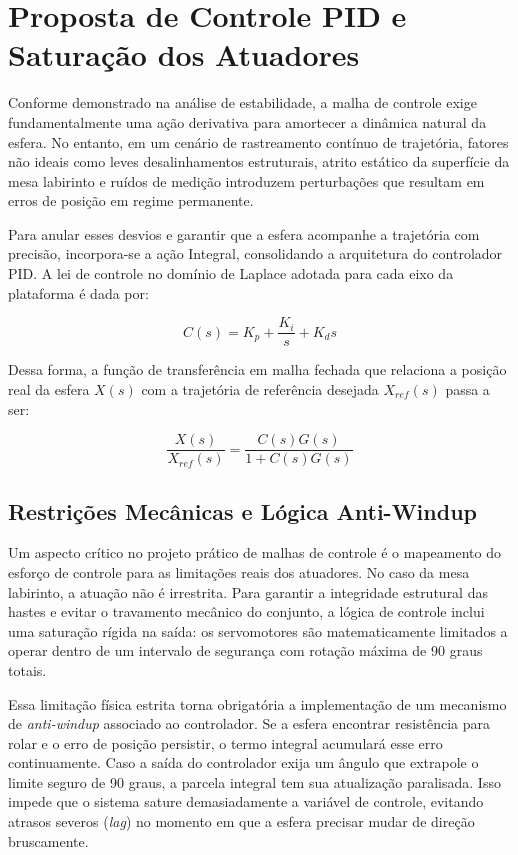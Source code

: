 \documentclass[12pt]{article}
\begin{document}
\section{Proposta de Controle PID e Saturação dos Atuadores}

Conforme demonstrado na análise de estabilidade, a malha de controle exige fundamentalmente uma ação derivativa para amortecer a dinâmica natural da esfera. No entanto, em um cenário de rastreamento contínuo de trajetória, fatores não ideais como leves desalinhamentos estruturais, atrito estático da superfície da mesa labirinto e ruídos de medição introduzem perturbações que resultam em erros de posição em regime permanente.

Para anular esses desvios e garantir que a esfera acompanhe a trajetória com precisão, incorpora-se a ação Integral, consolidando a arquitetura do controlador PID. A lei de controle no domínio de Laplace adotada para cada eixo da plataforma é dada por:

\begin{equation}
    C(s) = K_p + \frac{K_i}{s} + K_d s
\end{equation}

Dessa forma, a função de transferência em malha fechada que relaciona a posição real da esfera $X(s)$ com a trajetória de referência desejada $X_{ref}(s)$ passa a ser:

\begin{equation}
    \frac{X(s)}{X_{ref}(s)} = \frac{C(s)G(s)}{1 + C(s)G(s)}
\end{equation}

\subsection{Restrições Mecânicas e Lógica Anti-Windup}

Um aspecto crítico no projeto prático de malhas de controle é o mapeamento do esforço de controle para as limitações reais dos atuadores. No caso da mesa labirinto, a atuação não é irrestrita. Para garantir a integridade estrutural das hastes e evitar o travamento mecânico do conjunto, a lógica de controle inclui uma saturação rígida na saída: os servomotores são matematicamente limitados a operar dentro de um intervalo de segurança com rotação máxima de 90 graus totais.

Essa limitação física estrita torna obrigatória a implementação de um mecanismo de \textit{anti-windup} associado ao controlador. Se a esfera encontrar resistência para rolar e o erro de posição persistir, o termo integral acumulará esse erro continuamente. Caso a saída do controlador exija um ângulo que extrapole o limite seguro de 90 graus, a parcela integral tem sua atualização paralisada. Isso impede que o sistema sature demasiadamente a variável de controle, evitando atrasos severos (\textit{lag}) no momento em que a esfera precisar mudar de direção bruscamente.
\end{document}
